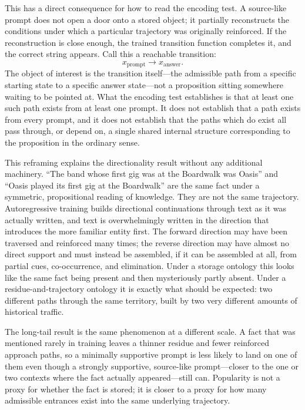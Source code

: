\documentclass[11pt]{article}
\begin{document}
This has a direct consequence for how to read the encoding test. A source-like prompt does not open a door onto a stored object; it partially reconstructs the conditions under which a particular trajectory was originally reinforced. If the reconstruction is close enough, the trained transition function completes it, and the correct string appears. Call this a reachable transition:
\[
x_{\text{prompt}} \longrightarrow x_{\text{answer}}.
\]
The object of interest is the transition itself---the admissible path from a specific starting state to a specific answer state---not a proposition sitting somewhere waiting to be pointed at. What the encoding test establishes is that at least one such path exists from at least one prompt. It does not establish that a path exists from every prompt, and it does not establish that the paths which do exist all pass through, or depend on, a single shared internal structure corresponding to the proposition in the ordinary sense.

This reframing explains the directionality result without any additional machinery. ``The band whose first gig was at the Boardwalk was Oasis'' and ``Oasis played its first gig at the Boardwalk'' are the same fact under a symmetric, propositional reading of knowledge. They are not the same trajectory. Autoregressive training builds directional continuations through text as it was actually written, and text is overwhelmingly written in the direction that introduces the more familiar entity first. The forward direction may have been traversed and reinforced many times; the reverse direction may have almost no direct support and must instead be assembled, if it can be assembled at all, from partial cues, co-occurrence, and elimination. Under a storage ontology this looks like the same fact being present and then mysteriously partly absent. Under a residue-and-trajectory ontology it is exactly what should be expected: two different paths through the same territory, built by two very different amounts of historical traffic.

The long-tail result is the same phenomenon at a different scale. A fact that was mentioned rarely in training leaves a thinner residue and fewer reinforced approach paths, so a minimally supportive prompt is less likely to land on one of them even though a strongly supportive, source-like prompt---closer to the one or two contexts where the fact actually appeared---still can. Popularity is not a proxy for whether the fact is stored; it is closer to a proxy for how many admissible entrances exist into the same underlying trajectory.
\end{document}

